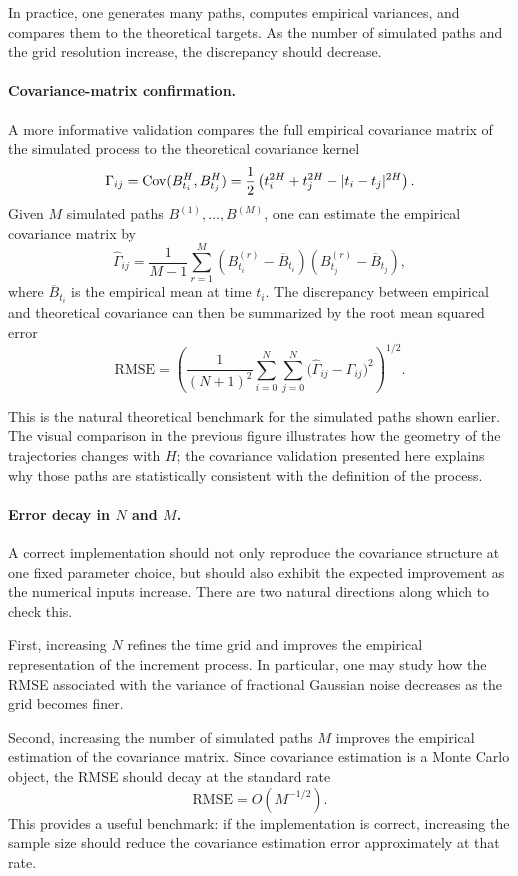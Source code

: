 In practice, one generates many paths, computes empirical variances, and compares them to the theoretical targets. As the number of simulated paths and the grid resolution increase, the discrepancy should decrease.

\paragraph{Covariance-matrix confirmation.} A more informative validation compares the full empirical covariance matrix of the simulated process to the theoretical covariance kernel
\[
\Gamma_{ij}
=
\operatorname{Cov}(B_{t_i}^H,B_{t_j}^H)
=
\frac12\left(
t_i^{2H}+t_j^{2H}-|t_i-t_j|^{2H}
\right).
\]
Given \(M\) simulated paths \(B^{(1)},\dots,B^{(M)}\), one can estimate the empirical covariance matrix by
\[
\widehat{\Gamma}_{ij}
=
\frac{1}{M-1}
\sum_{r=1}^{M}
\left(B_{t_i}^{(r)}-\overline{B}_{t_i}\right)
\left(B_{t_j}^{(r)}-\overline{B}_{t_j}\right),
\]
where \(\overline{B}_{t_i}\) is the empirical mean at time \(t_i\). The discrepancy between empirical and theoretical covariance can then be summarized by the root mean squared error
\[
\mathrm{RMSE}
=
\left(
\frac{1}{(N+1)^2}
\sum_{i=0}^{N}\sum_{j=0}^{N}
\bigl(\widehat{\Gamma}_{ij}-\Gamma_{ij}\bigr)^2
\right)^{1/2}.
\]

This is the natural theoretical benchmark for the simulated paths shown earlier. The visual comparison in the previous figure illustrates how the geometry of the trajectories changes with \(H\); the covariance validation presented here explains why those paths are statistically consistent with the definition of the process.

\paragraph{Error decay in \(N\) and \(M\).} A correct implementation should not only reproduce the covariance structure at one fixed parameter choice, but should also exhibit the expected improvement as the numerical inputs increase. There are two natural directions along which to check this.

First, increasing \(N\) refines the time grid and improves the empirical representation of the increment process. In particular, one may study how the RMSE associated with the variance of fractional Gaussian noise decreases as the grid becomes finer.

Second, increasing the number of simulated paths \(M\) improves the empirical estimation of the covariance matrix. Since covariance estimation is a Monte Carlo object, the RMSE should decay at the standard rate
\[
\mathrm{RMSE}=O(M^{-1/2}).
\]
This provides a useful benchmark: if the implementation is correct, increasing the sample size should reduce the covariance estimation error approximately at that rate.


